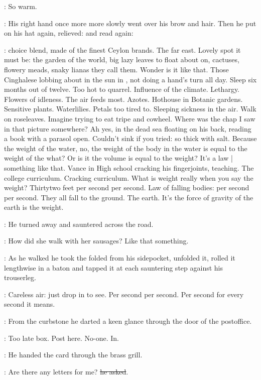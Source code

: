 \BloomInt:
So warm.

:
His right hand once more more slowly went over his brow and hair. 
Then he put on his hat again, relieved:
and read again:

\BloomInt:
choice blend, made of the finest Ceylon brands.
The far east.
Lovely spot it must be:
the garden of the world,
big lazy leaves to float about on,
cactuses, flowery meads,
snaky lianas they call them.
Wonder is it like that.
Those Cinghalese lobbing about in the sun in ,
not doing a hand's turn all day.
Sleep six months out of twelve.
Too hot to quarrel.
Influence of the climate.
Lethargy.
Flowers of idleness.
The air feeds most.
Azotes.
Hothouse in Botanic gardens.
Sensitive plants.
Waterlilies.
Petals too tired to.
Sleeping sickness in the air.
Walk on roseleaves.
Imagine trying to eat tripe and cowheel.
Where was the chap I saw in that picture somewhere?
Ah yes, in the dead sea floating on his back,
reading a book with a parasol open.
Couldn't sink if you tried:
so thick with salt.
Because the weight of the water,
no, the weight of the body in the water
is equal to the weight of the what?
Or is it the volume
is equal to the weight?
It's a law |
something like that.
Vance in High school cracking his fingerjoints, teaching.
The college curriculum.
Cracking curriculum.
What is weight really when you say the weight?
Thirtytwo feet per second per second.
Law of falling bodies:
per second per second.
They all fall to the ground.
The earth.
It's the force of gravity of the earth
is the weight.

:
He turned away and sauntered across the road.

\BloomInt:
How did she walk with her sausages?
Like that something.

:
As he walked he took the folded  from his sidepocket,
unfolded it, rolled it lengthwise in a baton
and tapped it at each sauntering step against his trouserleg.

\BloomInt:
Careless air: just drop in to see.
Per second per second.
Per second for every second
it means.

:
From the curbstone
he darted a keen glance through the door of the postoffice.

\BloomInt:
Too late box.
Post here.
No-one.
In.

:
He handed the card through the brass grill.

\Bloom:
Are there any letters for me?
\sout{he asked}.

